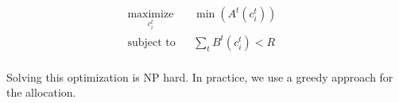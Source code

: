 \begin{equation}
  \label{eq:multitask}
  \begin{aligned}
    & \underset{c_i^t}{\text{maximize}} & & \min({A^t(c_i^t)}) & & \\
    & \text{subject to} & & \sum_t{B^t(c_i^t)} < R & & \\
  \end{aligned}
\end{equation}

Solving this optimization is NP hard. In practice, we use a greedy approach for
the allocation.

